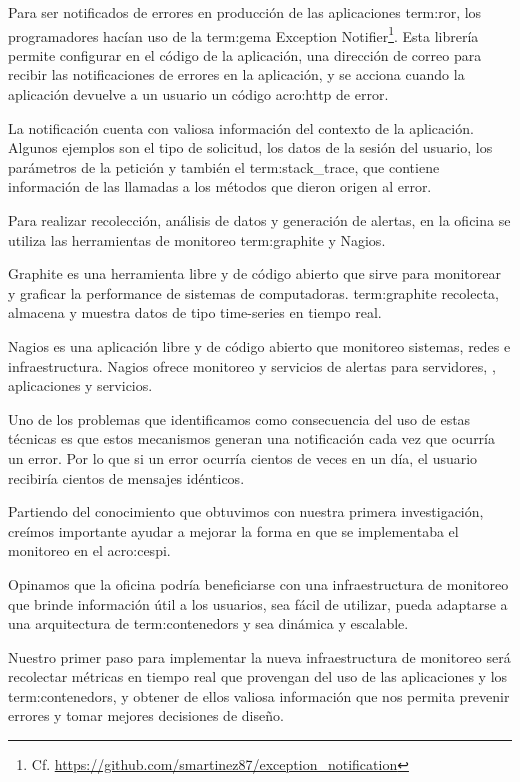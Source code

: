 Para ser notificados de errores en producción de las aplicaciones
\gls{term:ror}, los programadores hacían uso de la \gls{term:gema} Exception
Notifier\footnote{Cf.
\url{https://github.com/smartinez87/exception_notification}}. Esta librería
permite configurar en el código de la aplicación, una dirección de correo para
recibir las notificaciones de errores en la aplicación, y se acciona cuando la
aplicación devuelve a un usuario un código \gls{acro:http} de error.

La notificación cuenta con valiosa información del contexto de la aplicación.
Algunos ejemplos son el tipo de solicitud, los datos de la sesión del usuario,
los parámetros de la petición y también el \gls{term:stack_trace}, que contiene
información de las llamadas a los métodos que dieron origen al error.

Para realizar recolección, análisis de datos y generación de alertas, en la
oficina se utiliza las herramientas de monitoreo \gls{term:graphite} y Nagios.

Graphite es una herramienta libre y de código abierto que sirve para monitorear
y graficar la performance de sistemas de computadoras. \gls{term:graphite} recolecta,
almacena y muestra datos de tipo time-series en tiempo real.

Nagios es una aplicación libre y de código abierto que monitoreo sistemas,
redes e infraestructura. Nagios ofrece monitoreo y servicios de alertas para
servidores, , aplicaciones y servicios.

Uno de los problemas que identificamos como consecuencia del uso de estas
técnicas es que estos mecanismos generan una notificación cada vez que ocurría
un error. Por lo que si un error ocurría cientos de veces en un día, el usuario
recibiría cientos de mensajes idénticos.

Partiendo del conocimiento que obtuvimos con nuestra primera investigación,
creímos importante ayudar a mejorar la forma en que se implementaba el
monitoreo en el \gls{acro:cespi}.

Opinamos que la oficina podría beneficiarse con una infraestructura de
monitoreo que brinde información útil a los usuarios, sea fácil de utilizar,
pueda adaptarse a una arquitectura de \glspl{term:contenedor} y sea dinámica y
escalable.

Nuestro primer paso para implementar la nueva infraestructura de monitoreo será
recolectar métricas en tiempo real que provengan del uso de las aplicaciones y
los \glspl{term:contenedor}, y obtener de ellos valiosa información que nos
permita prevenir errores y tomar mejores decisiones de diseño.

